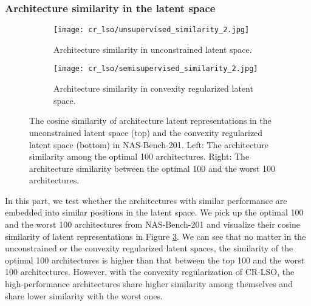 \documentclass[10pt,twocolumn,letterpaper]{article}
\begin{document}
\subsubsection{Architecture similarity in the latent space}
\begin{figure}
	\centering
	\begin{subfigure}{1.0 \linewidth}
		\texttt{[image: cr\_lso/unsupervised\_similarity\_2.jpg]}
		\caption{Architecture similarity in unconstrained latent space.}
		\label{fig:short-a}
	\end{subfigure}
	\hfill
	\begin{subfigure}{1.0 \linewidth}
		\texttt{[image: cr\_lso/semisupervised\_similarity\_2.jpg]}
		\caption{Architecture similarity in convexity regularized latent space.}
		\label{fig:short-a}
	\end{subfigure}
	\caption{The cosine similarity of architecture latent representations in the unconstrained latent space (top) and the convexity regularized latent space (bottom) in NAS-Bench-201. Left: The architecture similarity among the optimal 100 architectures. Right: The architecture similarity between the optimal 100 and the worst 100 architectures. }
	\label{fig:short}
\end{figure} 
In this part, we test whether the architectures with similar performance are embedded into similar positions in the latent space. We pick up the optimal 100 and the worst 100 architectures from NAS-Bench-201 and visualize their cosine similarity of latent representations in Figure \ref{fig:short}. We can see that no matter in the unconstrained or the convexity regularized latent spaces, the similarity of the optimal 100 architectures is higher than that between the top 100 and the worst 100 architectures. However, with the convexity regularization of CR-LSO, the high-performance architectures share higher similarity among themselves and share lower similarity with the worst ones. 
\end{document}
